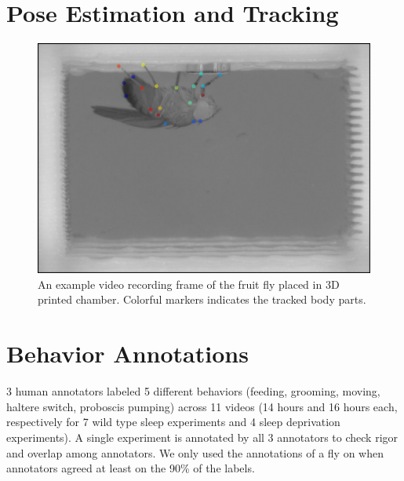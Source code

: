 \section{Pose Estimation and Tracking}

\begin{figure}[ht!]
	\centering
	\includegraphics[width=0.75\linewidth]{figures/FlyTrackedBodyParts.png}
	\caption[An example frame of the fruit fly placed in 3D printed chamber.] {An example video recording frame of the fruit fly placed in 3D printed chamber. Colorful markers indicates the tracked body parts.}
\end{figure}

\section{Behavior Annotations}

3 human annotators labeled 5 different behaviors (feeding, grooming, moving, haltere switch, proboscis pumping) across 11 videos (14 hours and 16 hours each, respectively for 7 wild type sleep experiments and 4 sleep deprivation experiments).
A single experiment is annotated by all 3 annotators to check rigor and overlap among annotators. We only used the annotations of a fly on when  annotators agreed at least on the 90\% of the labels.

